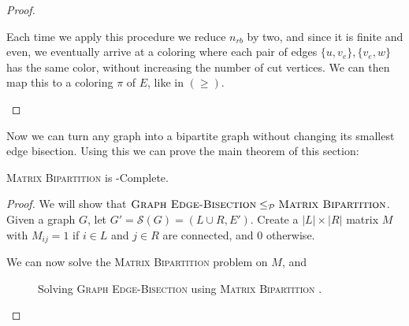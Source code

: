 \documentclass{article}
\newcommand{\mbpt}{\textsc{Matrix \allowbreak Bipartition} }
\newcommand{\geb}{\textsc{Graph \allowbreak Edge-\allowbreak Bisection} }
\begin{document}
\begin{proof}
\begin{enumerate}
					Each time we apply this procedure we reduce $n_{rb}$ by
					two, and since it is finite and even, we eventually arrive
					at a coloring where each pair of edges $\{u, v_e\},
					\{v_e, w\}$ has the same color, without increasing the
					number of cut vertices. We can then map this to
					a coloring $\pi$ of $E$, like in $(\geq)$.
		\end{enumerate}
	\end{proof}

	Now we can turn any graph into a bipartite graph without changing its
	smallest edge bisection. Using this we can prove the main theorem of this
	section:

	\begin{theorem}
		\label{main-thm}
		\mbpt is \NP-Complete.
	\end{theorem}
	\begin{proof}
		We will show that $\geb \leq_{\mathcal{P}} \mbpt$. Given a graph $G$,
		let $G'=\mathcal{S}(G)=(L\cup R, E')$. Create a $|L| \times |R|$ matrix
		$M$ with $M_{ij} = 1$ if $i \in L$ and $j \in R$ are connected, and $0$
		otherwise.

		We can now solve the \mbpt problem on $M$, and 

		\begin{figure}[h]
			
			\centering
			\label{mat-equiv}
			\caption{Solving \geb using \mbpt.}
		\end{figure}
	\end{proof}
\end{document}
